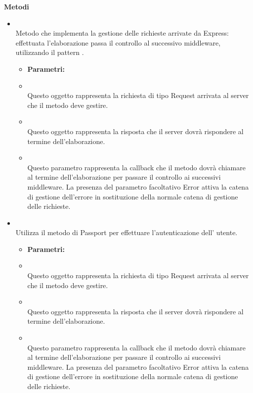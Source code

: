 		\textbf{Metodi} 
	\begin{itemize}
					\item[] \textbf{} \\ Metodo che implementa la gestione delle richieste arrivate da Express: effettuata l'elaborazione passa il controllo al successivo middleware, utilizzando il pattern .
						\begin{itemize}\addtolength{\itemsep}{-0.5\baselineskip}
						\item[] \textbf{Parametri:}
						\item[]  \\ Questo oggetto rappresenta la richiesta di tipo Request arrivata al server che il metodo deve gestire.	
						\item[]  \\ Questo oggetto rappresenta la risposta che il server dovrà rispondere al termine dell'elaborazione.	
						\item[]  \\ Questo parametro rappresenta la callback che il metodo dovrà chiamare al termine dell'elaborazione per passare il controllo ai successivi middleware. La presenza del parametro facoltativo Error attiva la catena di gestione dell'errore in sostituzione della normale catena di gestione delle richieste.	
				\end{itemize}
					\item[] \textbf{} \\ Utilizza il metodo  di Passport per effettuare l'autenticazione dell' utente.
						\begin{itemize}\addtolength{\itemsep}{-0.5\baselineskip}
						\item[] \textbf{Parametri:}
						\item[]  \\ Questo oggetto rappresenta la richiesta di tipo Request arrivata al server che il metodo deve gestire.	
						\item[]  \\ Questo oggetto rappresenta la risposta che il server dovrà rispondere al termine dell'elaborazione.	
						\item[]  \\ Questo parametro rappresenta la callback che il metodo dovrà chiamare al termine dell'elaborazione per passare il controllo ai successivi middleware. La presenza del parametro facoltativo Error attiva la catena di gestione dell'errore in sostituzione della normale catena di gestione delle richieste.	

\end{itemize}
\end{itemize}
